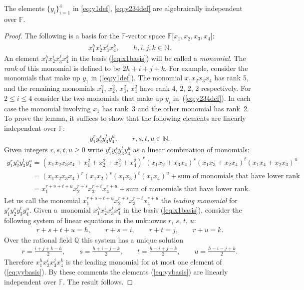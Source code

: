 \begin{Lemma}
\label{lem:fiveindep}
The elements
 $\lbrace y_i\rbrace_{i=1}^4$ in
\eqref{eq:y1def},
\eqref{eq:y234def}
 are algebraically
independent over $\mathbb F$.
\end{Lemma}
\begin{proof}
The following is a basis for
the $\mathbb F$-vector space
$\mathbb F\lbrack x_1, x_2, x_3, x_4\rbrack$:
\begin{gather}
x_1^hx_2^ix_3^jx_4^k, \qquad h,i,j,k\in \mathbb N.
\label{eq:x1basis}
\end{gather}
An element
$x_1^hx_2^ix_3^jx_4^k$
in
the basis
(\ref{eq:x1basis}) will be called a {\it monomial}.
The {\it rank} of this monomial is def\/ined
to be $2h+i+j+k$.
For example,
consider the monomials that make up
$y_1$ in
(\ref{eq:y1def}).
The monomial
$x_1x_2x_3x_4$ has rank 5, and
the remaining monomials
$x_1^2$, $x_2^2$, $x_3^2$, $x_4^2$ have rank
$4$, $2$, $2$, $2$ respectively.
For $2 \leq i \leq 4$
consider the two monomials that make up $y_i$ in~(\ref{eq:y234def}). In each case
the monomial involving $x_1$ has
rank~3 and the other monomial
has rank~2.
To prove the lemma,
it suf\/f\/ices to show that the following elements
are linearly independent over $\mathbb F$:
\begin{gather}
y_1^ry_2^sy_3^ty_4^u, \qquad r,s,t,u\in \mathbb N.
\label{eq:yybasis}
\end{gather}
Given integers $r,s,t,u\geq 0$
 write
$y_1^ry_2^sy_3^ty_4^u$
as a linear combination of monomials:
\begin{gather*}
y_1^ry_2^sy_3^ty_4^u
=
(x_1x_2x_3x_4
+x_1^2+x_2^2+x_3^2+x_4^2)^r
(x_1x_2+x_3x_4)^s
(x_1x_3+x_2x_4)^t
(x_1x_4+x_2x_3)^u
\\
\phantom{y_1^ry_2^sy_3^ty_4^u}{} =
(x_1x_2x_3x_4)^r
(x_1x_2)^s
(x_1x_3)^t
(x_1x_4)^u
 + {\mbox{sum of monomials that have lower rank}}
\\
\phantom{y_1^ry_2^sy_3^ty_4^u}{} =
x_1^{r+s+t+u}
x_2^{r+s}
x_3^{r+t}
x_4^{r+u}
  +  {\mbox{sum of monomials that have lower rank}}.
\end{gather*}
Let us call
the monomial
$x_1^{r+s+t+u}
x_2^{r+s}
x_3^{r+t}
x_4^{r+u} $ the {\it leading monomial} for
$y_1^ry_2^sy_3^ty_4^u$. Given a~monomial $x_1^hx_2^ix_3^jx_4^k$ in the basis
(\ref{eq:x1basis}), consider the following
system of
linear equations in the unknowns $r$, $s$, $t$, $u$:
\begin{gather*}
r+s+t+u=h,
\qquad r+s=i,
\qquad r+t=j,
\qquad r+u=k.
\end{gather*}
Over the rational f\/ield $\mathbb Q$ this system has a unique
solution
\begin{gather*}
 r = \frac{i+j+k-h}{2},
\qquad
s = \frac{h+i-j-k}{2},
\qquad
 t = \frac{h-i+j-k}{2},
  \qquad
u = \frac{h-i-j+k}{2}.
\end{gather*}
Therefore
 $x_1^hx_2^ix_3^jx_4^k$
is the leading monomial
for at most one element
of (\ref{eq:yybasis}).
By these comments the elements
(\ref{eq:yybasis}) are linearly independent over $\mathbb F$.
The result follows.
\end{proof}


